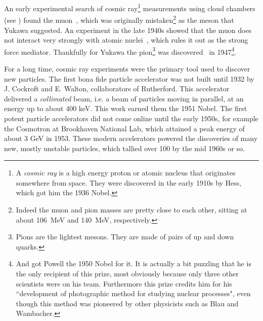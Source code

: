 An early experimental search of cosmic ray\footnote{A {\it cosmic ray} is a high
energy proton or atomic nucleus that originates somewhere from space. They were
discovered in the early 1910s by Hess, which got him the 1936 Nobel. }
 measurements using
cloud chambers (see ) 
found the muon~\cite{neddermeyer_note_1937}, which was originally 
mistaken\footnote{Indeed the muon and pion masses are pretty close to each
other, sitting at about 106~MeV and 140~MeV, respectively.}
as the meson that Yukawa suggested. An experiment in the late 1940s showed that
the muon does not interact very strongly with atomic
nuclei~\cite{conversi_disintegration_1947}, which rules it out as the strong
force mediator. Thankfully for Yukawa the
pion\footnote{Pions are the lightest
mesons. They are made of pairs of up and down quarks.} was
discovered~\cite{lattes_processes_1947} in 1947\footnote{And got Powell
the 1950 Nobel for it. It is actually a bit puzzling that he is the only
recipient of this prize, most obviously because only three other scientists were
on his team. Furthermore this prize credits him for his ``development of
photographic method for studying nuclear processes", even though this method was
pioneered by other physicists such as Blau and Wambacher.}.

For a long
time, cosmic ray experiments were the primary tool used to discover new
particles. The first bona fide particle accelerator was not built until 1932
by J. Cockroft and E. Walton, collaborators of Rutherford. This accelerator
delivered a {\it collimated} beam, i.e. a beam of particles
moving in parallel, at an energy up to about 400 keV. This work earned them the
1951 Nobel. The first potent particle accelerators did not come online until
the early 1950s, for example the Cosmotron
at Brookhaven National Lab, which attained a peak energy of about 3 GeV in 1953.
These modern accelerators powered the discoveries of many new, mostly unstable
particles, which tallied over 100 by the mid 1960s or so.



